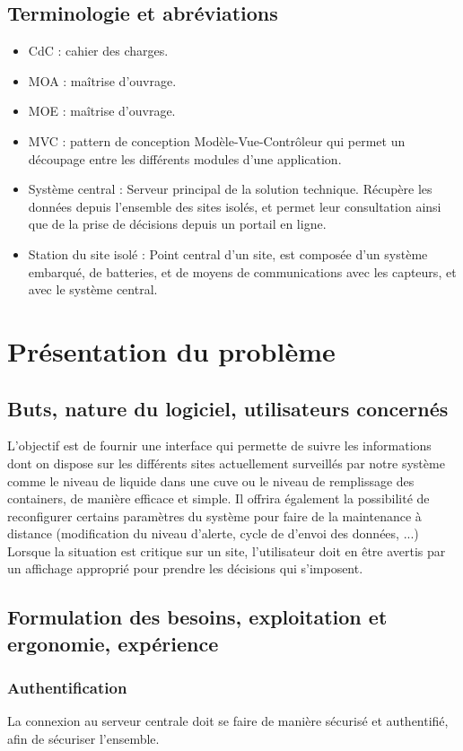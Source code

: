 \subsection{Terminologie et abréviations}
\begin{itemize}
	\item CdC : cahier des charges.
	\item MOA : maîtrise d'ouvrage.
	\item MOE : maîtrise d'ouvrage.
	\item MVC : pattern de conception Modèle-Vue-Contrôleur qui permet un découpage entre les différents modules d'une application.
	\item Système central : Serveur principal de la solution technique. Récupère les données depuis l'ensemble des sites isolés, et permet leur consultation ainsi que de la prise de décisions depuis un portail en ligne.
	\item Station du site isolé : Point central d'un site, est composée d'un système embarqué, de batteries, et de moyens de communications avec les capteurs, et avec le système central.
\end{itemize}

\section{Présentation du problème}
\subsection{Buts, nature du logiciel, utilisateurs concernés}
L'objectif est de fournir une interface qui permette de suivre les informations dont on dispose sur les différents sites actuellement surveillés par notre système comme le niveau de liquide dans une cuve ou le niveau de remplissage des containers, de manière efficace et simple. Il offrira également la possibilité de reconfigurer certains paramètres du système pour faire de la maintenance à distance (modification du niveau d'alerte, cycle de d'envoi des données, ...)
Lorsque la situation est critique sur un site, l'utilisateur doit en être avertis par un affichage approprié pour prendre les décisions qui s'imposent.

\subsection{Formulation des besoins, exploitation et ergonomie, expérience}

\subsubsection{Authentification}
La connexion au serveur centrale doit se faire de manière sécurisé et authentifié, afin de sécuriser l'ensemble.

